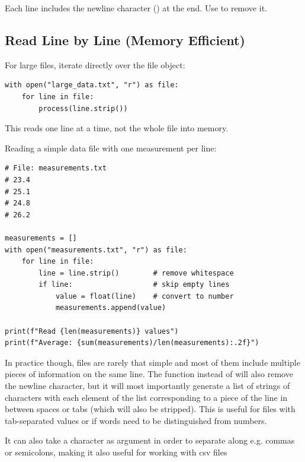 \begin{note}
Each line includes the newline character (\py{\\n}) at the end. Use  to remove it.
\end{note}

\subsection{Read Line by Line (Memory Efficient)}

For large files, iterate directly over the file object:

\begin{lstlisting}
with open("large_data.txt", "r") as file:
    for line in file:
        process(line.strip())
\end{lstlisting}

This reads one line at a time, not the whole file into memory.

\begin{labexample}
Reading a simple data file with one measurement per line:

\begin{lstlisting}
# File: measurements.txt
# 23.4
# 25.1
# 24.8
# 26.2

measurements = []
with open("measurements.txt", "r") as file:
    for line in file:
        line = line.strip()        # remove whitespace
        if line:                   # skip empty lines
            value = float(line)    # convert to number
            measurements.append(value)

print(f"Read {len(measurements)} values")
print(f"Average: {sum(measurements)/len(measurements):.2f}")
\end{lstlisting}
\end{labexample}

In practice though, files are rarely that simple and most of them include multiple pieces of information on the same line. The  function instead of  will also remove the newline character, but it will most importantly generate a list of strings of characters with each element of the list corresponding to a piece of the line in between spaces or tabs (which will also be stripped). This is useful for files with tab-separated values or if words need to be distinguished from numbers.

It can also take a character as argument in order to separate along e.g. commas or semicolons, making it also useful for working with csv files

